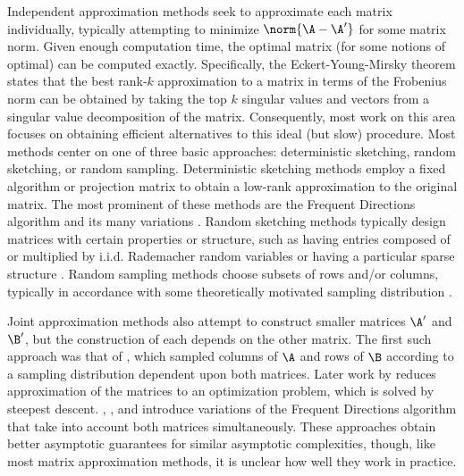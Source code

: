 Independent approximation methods seek to approximate each matrix individually, typically attempting to minimize $\norm{\A - \A^\prime}$ for some matrix norm. Given enough computation time, the optimal matrix (for some notions of optimal) can be computed exactly. Specifically, the Eckert-Young-Mirsky theorem \cite{eckartYoungMirskyThm} states that the best rank-$k$ approximation to a matrix in terms of the Frobenius norm can be obtained by taking the top $k$ singular values and vectors from a singular value decomposition of the matrix. Consequently, most work on this area focuses on obtaining efficient alternatives to this ideal (but slow) procedure. Most methods center on one of three basic approaches: deterministic sketching, random sketching, or random sampling. Deterministic sketching methods employ a fixed algorithm or projection matrix to obtain a low-rank approximation to the original matrix. The most prominent of these methods are the Frequent Directions algorithm \cite{liberty_simple_2012, ghashami_frequent_2016} and its many variations \cite{teng_fast_2019, francis_practical_2018, ye_frequent_2016, huang_near_2019, luo_robust_2019, francis_improvement_2018}. Random sketching methods typically design matrices with certain properties or structure, such as having entries composed of or multiplied by i.i.d. Rademacher random variables \cite{sarlos_improved_2006, kyrillidis_approximate_2014, pagh_compressed_2013} or having a particular sparse structure \cite{osnap}. Random sampling methods choose subsets of rows and/or columns, typically in accordance with some theoretically motivated sampling distribution \cite{drineas_fast_2006-1, drineas_fast_2006-2}.

Joint approximation methods also attempt to construct smaller matrices $\A^\prime$ and $\B^\prime$, but the construction of each depends on the other matrix. The first such approach was that of \citet{drineas_fast_2006}, which sampled columns of $\A$ and rows of $\B$ according to a sampling distribution dependent upon both matrices. Later work by \citet{manne_fast_2014} reduces approximation of the matrices to an optimization problem, which is solved by steepest descent. \citet{mroueh_co-occuring_2016}, \citet{ye_frequent_2016}, and \citet{francis_improvement_2018} introduce variations of the Frequent Directions algorithm that take into account both matrices simultaneously. These approaches obtain better asymptotic guarantees for similar asymptotic complexities, though, like most matrix approximation methods, it is unclear how well they work in practice.



